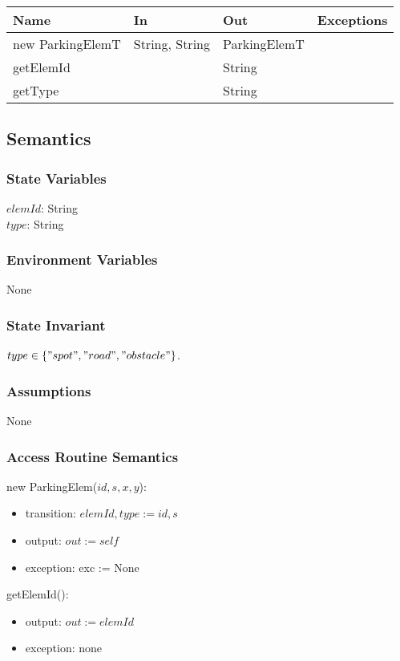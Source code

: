 \documentclass[12pt, titlepage]{article}
\begin{document}
\begin{tabular}{l l l l}
\hline
\textbf{Name} & \textbf{In} & \textbf{Out} & \textbf{Exceptions} \\
\hline
new ParkingElemT & String, String & ParkingElemT & ~ \\
getElemId & ~ & String & ~ \\
getType & ~ & String & ~ \\
\hline
\end{tabular}

\subsection{Semantics}

\subsubsection{State Variables}
$elemId$: String \\
$type$: String

\subsubsection{Environment Variables}
None

\subsubsection{State Invariant}
$type \in \{"spot", "road", "obstacle"\}$.

\subsubsection{Assumptions}
None

\subsubsection{Access Routine Semantics}

\noindent new ParkingElem($id, s, x, y$):
\begin{itemize}
\item transition: $elemId, type :=  id, s$
\item output: $out := self$
\item exception: exc := None
\end{itemize}

\noindent getElemId():
\begin{itemize} 
\item output: $out := elemId$
\item exception: none
\end{itemize}
\end{document}
